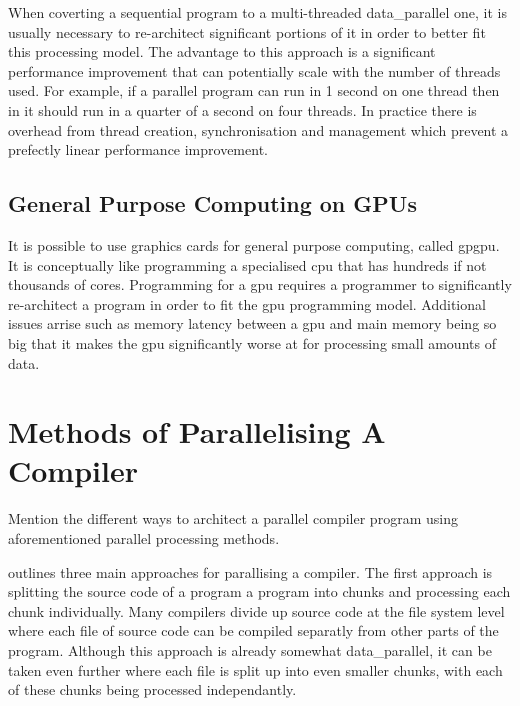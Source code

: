 When coverting a sequential program to a multi-threaded \gls{data_parallel}
one, it is usually necessary to re-architect significant portions of it in
order to better fit this processing model. The advantage to this approach is  a
significant performance improvement that can potentially scale with the number
of threads used. For example, if a parallel program can run in 1 second on
one thread then in it should run in a quarter of a second on four threads. In
practice there is overhead from thread creation, synchronisation and management
which prevent a prefectly linear performance improvement.

\subsection{General Purpose Computing on GPUs} \label{gpgpu}

It is possible to use graphics cards for general purpose computing, called
\gls{gpgpu}. It is conceptually like programming a specialised \gls{cpu} that
has hundreds if not thousands of cores. Programming for a \gls{gpu} requires a
programmer to significantly re-architect a program in order to fit the \gls{gpu}
programming model. Additional issues arrise such as memory latency between a
\gls{gpu} and main memory being so big that it makes the \gls{gpu} significantly
worse at for processing small amounts of data.

\section{Methods of Parallelising A Compiler} \label{compiler_parallel_methods}
\begin{sectionplan}
    Mention the different ways to architect a parallel compiler program using
aforementioned parallel processing methods.
\cite{hillis_data_1986, gross_parallel_1989, jena_design_2018, baer_model_1977}
\end{sectionplan}

\cite{gross_parallel_1989} outlines three main approaches for parallising a
compiler. The first approach is splitting the source code of a program a program
into chunks and processing each chunk individually. Many compilers divide up
source code at the file system level where each file of source code can be
compiled separatly from other parts of the program. Although this approach is
already somewhat \gls{data_parallel}, it can be taken even further where each
file is split up into even smaller chunks, with each of these chunks being
processed independantly.

